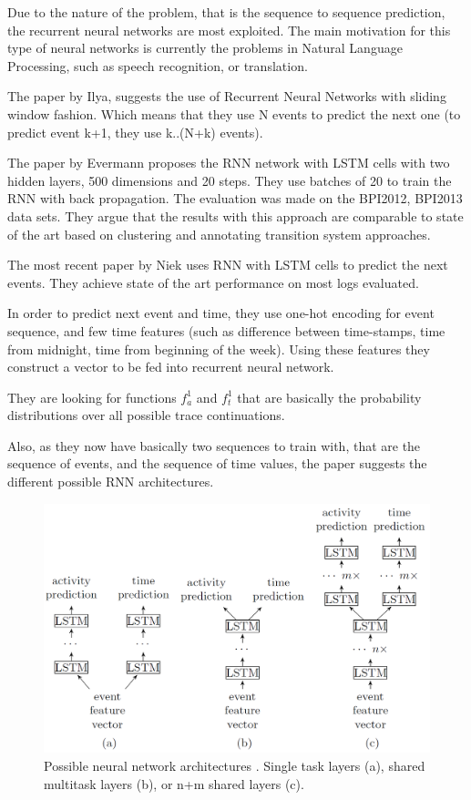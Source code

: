 Due to the nature of the problem, that is the sequence to sequence prediction, the recurrent neural networks are most exploited. The main motivation for this type of neural networks is currently the problems in Natural Language Processing, such as speech recognition\cite{graves2013icassp}, or translation\cite{Sutskever2014SSL29690332969173}. 

The paper by Ilya\cite{quteprints96732}, suggests the use of Recurrent Neural Networks with sliding window fashion. Which means that they use N events to predict the next one (to predict event k+1, they use k..(N+k) events). 

The paper by Evermann\cite{evermann} proposes the RNN network with LSTM cells with two hidden layers, 500 dimensions and 20 steps. They use batches of 20 to train the RNN with back propagation. The evaluation was made on the BPI2012, BPI2013 data sets. They argue that the results with this approach are comparable to state of the art based on clustering and annotating transition system approaches.

The most recent paper by Niek \cite{niek96732} uses RNN with LSTM cells to predict the next events. They achieve state of the art performance on most logs evaluated. 

In order to predict next event and time, they use one-hot encoding for event sequence, and few time features (such as difference between time-stamps, time from midnight, time from beginning of the week). Using these features they construct a vector to be fed into recurrent neural network. 

They are looking for functions $f_a^1$ and $f_t^1$ that are basically the probability distributions over all possible trace continuations.

Also, as they now have basically two sequences to train with, that are the sequence of events, and the sequence of time values, the paper suggests the different possible RNN architectures. 
\begin{figure}[!ht]
	\begin{center}  
		\includegraphics[width=\textwidth]{1.png}
		\caption{Possible neural network architectures \cite{niek96732}. Single task layers (a), shared multitask layers (b), or n+m shared layers (c).}
	\end{center}
\end{figure}

